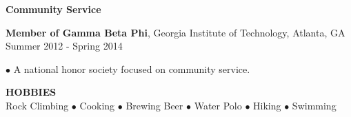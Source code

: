 \documentclass[10pt]{article}
\newenvironment{changemargin}[2]{%
  \list{}{\rightmargin#2\leftmargin#1
    \parsep=0pt\topsep=1pt\partopsep=0pt}
\item[]} {\endlist}
\newenvironment{indentmore}{\begin{changemargin}{10pt}{0cm}}{\end{changemargin}}
\begin{document}
{\bf Community Service} 
\begin{indentmore}
{\bf Member of Gamma Beta Phi}, Georgia Institute of Technology, Atlanta, GA \hfill Summer 2012 - Spring 2014
\begin{indentmore}
$\bullet$ A national honor society focused on community service. \\
\end{indentmore}
\end{indentmore}

\textbf{\large HOBBIES} \\
 Rock Climbing $\bullet$ Cooking $\bullet$ Brewing Beer $\bullet$ Water Polo $\bullet$ Hiking $\bullet$ Swimming
\end{document}
